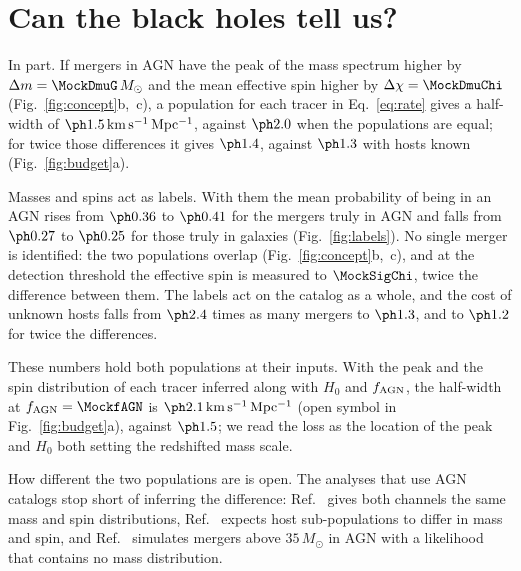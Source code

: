 \documentclass[aps,prd,reprint,superscriptaddress,nofootinbib]{revtex4-2}
\newcommand{\kms}{\,{\rm km\,s^{-1}\,Mpc^{-1}}}
\newcommand{\Msun}{\,M_\odot}
\newcommand{\fagn}{f_{\rm AGN}}
\newcommand{\dm}{\Delta m}
\newcommand{\dchi}{\Delta\chi}
\begin{document}
\section{Can the black holes tell us?}
\label{sec:labels}

In part. %
If mergers in AGN have the peak of the mass spectrum higher by $\dm=\MockDmuG\Msun$ and the mean
effective spin higher by $\dchi=\MockDmuChi$ (Fig.~\ref{fig:concept}b,~c), a population for each
tracer in
Eq.~\eqref{eq:rate} gives a half-width of $\IndHWMark\kms$, against $\IndHWMix$ when the
populations are equal; for twice those differences it gives $\IndHWMarkTwice$, against
$\IndHWKnown$ with hosts known (Fig.~\ref{fig:budget}a). %

Masses and spins act as labels. With them the mean probability of being in an AGN rises from
$\IndProbAGNPos$ to $\IndProbAGNMark$ for the mergers truly in AGN and falls from
$\IndProbGalPos$ to $\IndProbGalMark$ for those truly in galaxies
(Fig.~\ref{fig:labels}). %
No single merger is identified: the two populations overlap (Fig.~\ref{fig:concept}b,~c), and
at the detection threshold the effective spin is measured to $\MockSigChi$, twice the difference
between them. %
The labels act on the catalog as a whole, and the cost of unknown hosts falls from $\IndCostMix$
times as many mergers to $\IndCostMark$, and to $\IndCostMarkTwice$ for twice the
differences. %

These numbers hold both populations at their inputs. With the peak and the spin distribution of
each tracer inferred along with $H_0$ and $\fagn$, the half-width at $\fagn=\MockfAGN$ is
$\IndTwoPopHW\kms$ (open symbol in Fig.~\ref{fig:budget}a), against $\IndHWMark$; we read the
loss as the location of the peak and $H_0$ both setting the redshifted mass scale. %

How different the two populations are is open. The analyses that use AGN catalogs stop short of
inferring the difference: Ref.~\cite{Pouw:2026lar} gives both channels the same mass and
spin distributions, Ref.~\cite{Cross-Parkin:2026pua} expects host sub-populations to differ in
mass and spin, and Ref.~\cite{Bom:2023zgw} simulates mergers above $35\Msun$ in AGN with a
likelihood that contains no mass distribution.

\end{document}
